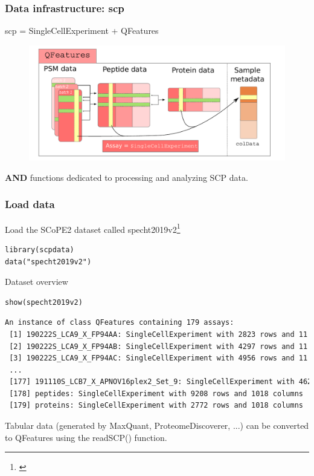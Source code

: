 \documentclass{beamer}
\newcommand{\hcode}[2][lgray]{{\ttfamily\color{vdgray}\colorbox{#1}{#2}}}
\newcommand{\frametitlesection}[1]{\frametitle{\centering #1 \footnotesize \hspace{0pt plus 1 filll} \insertsection}}
\begin{document}
\begin{frame}
    \frametitlesection{Data infrastructure: scp}

    \hcode{scp} = \hcode{SingleCellExperiment} + \hcode{QFeatures}
    \begin{figure}
        \centering
        \includegraphics[width=\linewidth]{figs/SCP_framework.pdf}
    \end{figure}

    \textbf{AND} functions dedicated to processing and analyzing SCP data.


\end{frame}

\begin{frame}[fragile]
    \frametitlesection{Load data}

    Load the SCoPE2 dataset called \hcode{specht2019v2}\footnote{\citet{Specht2019-jm}}

    \begin{lstlisting}
library(scpdata)
data("specht2019v2")
    \end{lstlisting}

    Dataset overview

    \begin{lstlisting}
show(specht2019v2)
    \end{lstlisting}

    \begin{lstlisting}[language = TeX, numbers = none, basicstyle = \tiny\ttfamily\color{vdgray}]
An instance of class QFeatures containing 179 assays:
 [1] 190222S_LCA9_X_FP94AA: SingleCellExperiment with 2823 rows and 11 col...
 [2] 190222S_LCA9_X_FP94AB: SingleCellExperiment with 4297 rows and 11 col...
 [3] 190222S_LCA9_X_FP94AC: SingleCellExperiment with 4956 rows and 11 col...
 ...
 [177] 191110S_LCB7_X_APNOV16plex2_Set_9: SingleCellExperiment with 4626 r...
 [178] peptides: SingleCellExperiment with 9208 rows and 1018 columns
 [179] proteins: SingleCellExperiment with 2772 rows and 1018 columns
    \end{lstlisting}

    \bigskip
    \footnotesize
    Tabular data (generated by MaxQuant, ProteomeDiscoverer,
    ...) can be converted to \hcode{QFeatures} using the \hcode{readSCP()} function.
\end{frame}
\end{document}
